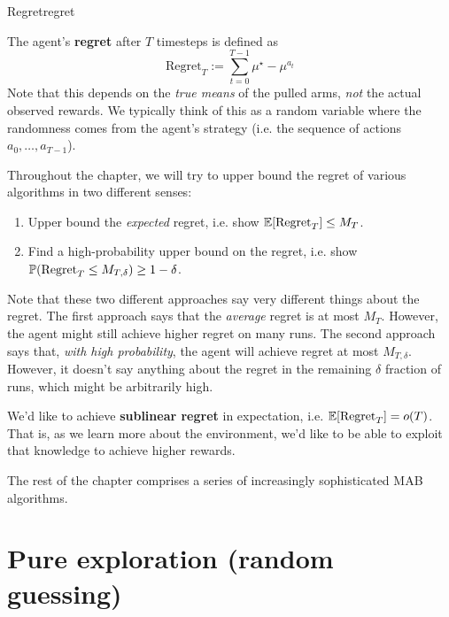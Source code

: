 \documentclass[\main/main]{subfiles}
\begin{document}
\begin{definition}{Regret}{regret}

    The agent's \textbf{regret} after $T$ timesteps is defined as
    \begin{equation}
        \text{Regret}_T := \sum_{t=0}^{T-1} \mu^\star - \mu^{a_t}
    \end{equation}
    Note that this depends on the \emph{true means} of the pulled arms, \emph{not} the actual observed rewards. We typically think of this as a random variable where the randomness comes from the agent's strategy (i.e. the sequence of actions $a_0, \dots, a_{T-1}$).

    Throughout the chapter, we will try to upper bound the regret of various algorithms in two different senses:
    \begin{enumerate}
        \item Upper bound the \emph{expected} regret, i.e. show $\E[\text{Regret}_T] \le M_T$.
        \item Find a high-probability upper bound on the regret, i.e. show $\P(\text{Regret}_T \le M_{T, \delta}) \ge 1-\delta$.
    \end{enumerate}
    Note that these two different approaches say very different things about the regret. The first approach says that the \emph{average} regret is at most $M_T$. However, the agent might still achieve higher regret on many runs. The second approach says that, \emph{with high probability}, the agent will achieve regret at most $M_{T, \delta}$. However, it doesn't say anything about the regret in the remaining $\delta$ fraction of runs, which might be arbitrarily high.

\end{definition}

We'd like to achieve \textbf{sublinear regret} in expectation, i.e. $\E[\text{Regret}_T] = o(T)$. That is, as we learn more about the environment, we'd like to be able to exploit that knowledge to achieve higher rewards.

The rest of the chapter comprises a series of increasingly sophisticated MAB algorithms.

\section{Pure exploration (random guessing)}
\end{document}
